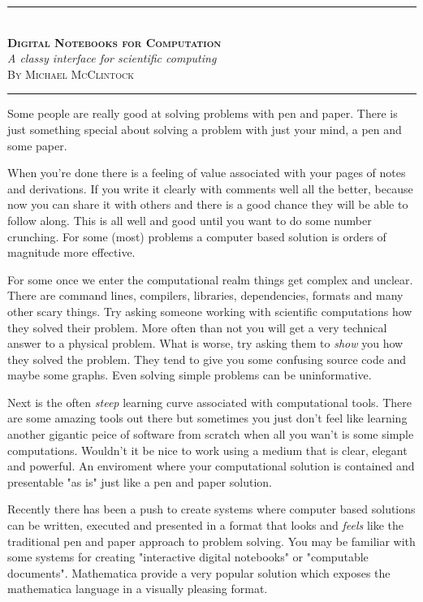 \documentclass[10pt, a4paper]{article}  %
\begin{document}
\begin{center}
    \rule[0.5ex]{1\columnwidth}{1pt}
    \\[4mm]
    \textbf{\textsc{\Huge Digital Notebooks for Computation}}
    \\[6mm]
    \textit{\Large A classy interface for scientific computing}
    \\[6mm]
    \textsc{\large By Michael McClintock}
    \\[4mm]
    \rule[0.5ex]{1\columnwidth}{1pt}
\end{center}

\begin{multicols}{2}

Some people are really good at solving problems with pen and paper. There is
just something special about solving a problem with just your mind, a pen and
some paper. 

When you're done there is a feeling of value associated with your pages of
notes and derivations. If you write it clearly with comments well all the
better, because now you can share it with others and there is a good chance
they will be able to follow along. This is all well and good until you want to
do some number crunching. For some (most) problems a computer based solution
is orders of magnitude more effective.

For some once we enter the computational realm things get complex and unclear.
There are command lines, compilers, libraries, dependencies, formats and many
other scary things. Try asking someone working with scientific computations
how they solved their problem. More often than not you will get a very
technical answer to a physical problem. What is worse, try asking them to
\emph{show} you how they solved the problem. They tend to give you some
confusing source code and maybe some graphs. Even solving simple problems can be uninformative.

Next is the often \emph{steep} learning curve associated with computational
tools. There are some amazing tools out there but sometimes you just don't
feel like learning another gigantic peice of software from scratch when all
you wan't is some simple computations. Wouldn't it be nice to work using a
medium that is clear, elegant and powerful. An enviroment where your
computational solution is contained and presentable "as is" just like a pen
and paper solution.

Recently there has been a push to create systems where computer based
solutions can be written, executed and presented in a format that looks and
\emph{feels} like the traditional pen and paper approach to problem solving.
You may be familiar with some systems for creating "interactive digital
notebooks" or "computable documents". Mathematica provide a very popular
solution which exposes the mathematica language in a visually pleasing format.


\end{multicols}
\end{document}
